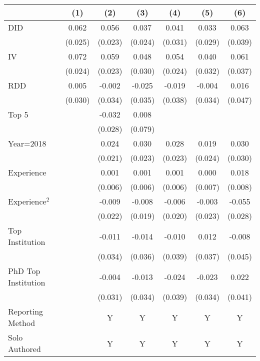 \begin{tabular}{l*{6}{c}}
\hline\hline
                &\multicolumn{1}{c}{(1)}&\multicolumn{1}{c}{(2)}&\multicolumn{1}{c}{(3)}&\multicolumn{1}{c}{(4)}&\multicolumn{1}{c}{(5)}&\multicolumn{1}{c}{(6)}\\
\hline
DID             &    0.062&    0.056&    0.037&    0.041&    0.033&    0.063\\
                &  (0.025)&  (0.023)&  (0.024)&  (0.031)&  (0.029)&  (0.039)\\
IV              &    0.072&    0.059&    0.048&    0.054&    0.040&    0.061\\
                &  (0.024)&  (0.023)&  (0.030)&  (0.024)&  (0.032)&  (0.037)\\
RDD             &    0.005&   -0.002&   -0.025&   -0.019&   -0.004&    0.016\\
                &  (0.030)&  (0.034)&  (0.035)&  (0.038)&  (0.034)&  (0.047)\\
Top 5           &         &   -0.032&    0.008&         &         &         \\
                &         &  (0.028)&  (0.079)&         &         &         \\
Year=2018       &         &    0.024&    0.030&    0.028&    0.019&    0.030\\
                &         &  (0.021)&  (0.023)&  (0.023)&  (0.024)&  (0.030)\\
Experience      &         &    0.001&    0.001&    0.001&    0.000&    0.018\\
                &         &  (0.006)&  (0.006)&  (0.006)&  (0.007)&  (0.008)\\
Experience$^2$  &         &   -0.009&   -0.008&   -0.006&   -0.003&   -0.055\\
                &         &  (0.022)&  (0.019)&  (0.020)&  (0.023)&  (0.028)\\
Top Institution &         &   -0.011&   -0.014&   -0.010&    0.012&   -0.008\\
                &         &  (0.034)&  (0.036)&  (0.039)&  (0.037)&  (0.045)\\
PhD Top Institution&         &   -0.004&   -0.013&   -0.024&   -0.023&    0.022\\
                &         &  (0.031)&  (0.034)&  (0.039)&  (0.034)&  (0.041)\\
Reporting Method &         &        Y&        Y&        Y&        Y&        Y\\
Solo Authored   &         &        Y&        Y&        Y&        Y&        Y\\

\end{tabular}
